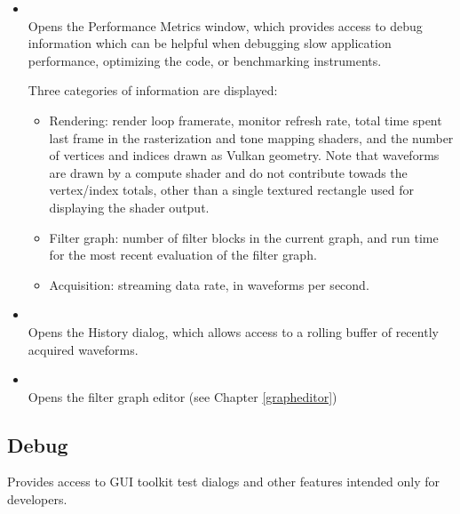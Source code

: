 \begin{itemize}
\item {}\\

Opens the Performance Metrics window, which provides access to debug information which can be helpful when debugging
slow application performance, optimizing the code, or benchmarking instruments.

Three categories of information are displayed:

\begin{itemize}
\item Rendering: render loop framerate, monitor refresh rate, total time spent last frame in the rasterization and tone
mapping shaders, and the number of vertices and indices drawn as Vulkan geometry. Note that waveforms are drawn by a
compute shader and do not contribute towads the vertex/index totals, other than a single textured rectangle used for
displaying the shader output.
\item Filter graph: number of filter blocks in the current graph, and run time for the most recent evaluation of the
filter graph.
\item Acquisition: streaming data rate, in waveforms per second.
\end{itemize}

\item {}\\

Opens the History dialog, which allows access to a rolling buffer of recently acquired waveforms.

\item {}\\
Opens the filter graph editor (see Chapter \ref{grapheditor})

\end{itemize}


\subsection{Debug}

Provides access to GUI toolkit test dialogs and other features intended only for developers.


